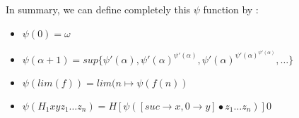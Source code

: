 \documentclass[10pt]{article}
\begin{document}
\begin{comment}

Then we must define \( \psi \) for the case when it collapses an uncountable ordinal, in such a way that \( \psi(h(\Omega)) \), for h correctly defined, is the least fixed point of \( \psi \circ h \), which can be written for example \( sup \lbrace 1, \psi(h(1)), \psi(h(\psi(h(1)))), \ldots \rbrace \)  as we previously saw. 

In RHS0 notation, \( \Omega \) is written \( H_1 suc\ 0 \) and the least fixed point of \( \psi \circ h \) can be written \( H (\psi \circ h) \zeta \) (with \( \zeta \) = 0 or 1 for example) \( = H [\psi(h(\bullet))] \zeta = H [\psi([suc \rightarrow x, 0 \rightarrow y] \bullet z_1 \ldots z_n)] \zeta \) if \( h(\Omega) = H_1 x y z_1 \ldots z_n \), so we have \( \psi(h(\Omega)) = \psi(H_1 x y z_1 \ldots z_n) = H [\psi([suc \rightarrow x, 0 \rightarrow y] \bullet z_1 \ldots z_n)] \zeta \) with always \( \zeta \) = 0 or 1 for example.

If \( h(\alpha) = \alpha \), then \( H(\Omega) = \Omega = H_1 suc\ 0, x = suc, y = 0, n = 0, \psi(\Omega) = \psi(H_1 suc\ 0) = H [\psi(suc \rightarrow suc, 0 \rightarrow 0] \bullet)] 0 = H \psi 0 = sup \lbrace 0, \psi(0), \psi(\psi(0)), \ldots \rbrace \).

If \( h(\alpha) = \Omega+\alpha \), then \( h(\Omega) = \Omega+\Omega = \Omega \cdot 2 = H_1 suc (H_1 suc\ 0), x = suc, y = H_1 suc\ 0, n = 0, \psi(h(\Omega)) = \psi(\Omega+\Omega) = \psi(\Omega \cdot 2) = \psi(H_1 suc (H_1 suc\ 0)) = H [\psi([suc \rightarrow suc, 0 \rightarrow H_1 suc 0] \bullet)] 0 = sup \lbrace 0, \psi([suc \rightarrow suc, 0 \rightarrow H_1 suc 0] 0) = \psi(H_1 suc_ 0) = psi(\Omega),  \psi([suc \rightarrow suc, 0 \rightarrow H_1 suc\ 0] (\psi(\Omega))) = \psi(\Omega+\psi(\Omega)), \ldots \rbrace \).

\bigskip

\end{comment}

In summary, we can define completely this \( \psi \) function by :

\begin{itemize}
     \setlength{\itemsep}{1pt}
     \setlength{\parskip}{0pt}
     \setlength{\parsep}{0pt}

\item \( \psi(0) = \omega \)

\item \( \psi(\alpha+1) = sup \lbrace \psi'(\alpha), \psi'(\alpha)^{\psi'(\alpha)}, \psi'(\alpha)^{\psi'(\alpha)^{\psi'(\alpha)}}, \ldots \rbrace \)

\item  \( \psi(lim(f)) = lim(n \mapsto \psi(f(n)) \)

\item \( \psi (H_1 x y z_1 \ldots z_n) = H [\psi([suc \rightarrow x, 0 \rightarrow y] \bullet z_1 \ldots z_n)] 0 \)

\end{itemize}
\end{document}
